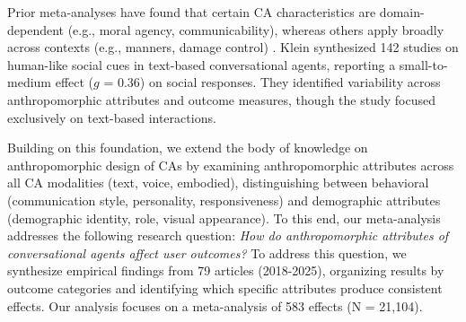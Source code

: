\documentclass[manuscript,screen,review,anonymous]{acmart}
\begin{document}
Prior meta-analyses have %
found that certain CA characteristics are domain-dependent (e.g., moral agency, communicability), whereas others apply broadly across contexts (e.g., manners, damage control) \cite{chaves2021should}. Klein \cite{klein_effects_2025} synthesized 142 studies on human-like social cues in text-based conversational agents, reporting a small-to-medium effect ($g$ = 0.36) on social responses. They identified variability across anthropomorphic attributes and outcome measures, though the study focused exclusively on text-based interactions. 

Building on this foundation, we extend the body of knowledge on anthropomorphic design of CAs by examining anthropomorphic attributes across all CA modalities (text, voice, embodied), distinguishing between behavioral (communication style, personality, responsiveness) and demographic attributes (demographic identity, role, visual appearance). %
To this end, our meta-analysis addresses the following research question: 
\textit{How do anthropomorphic attributes of conversational agents affect user outcomes?} 
To address this question, we synthesize empirical findings from 79 articles (2018-2025), organizing results by outcome categories and identifying which specific attributes produce consistent effects. Our analysis focuses on a meta-analysis of 583 effects (N = 21,104). %
\end{document}
